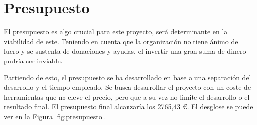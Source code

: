 \section{Presupuesto}

El presupuesto es algo crucial para este proyecto, será determinante en la viabilidad de este. Teniendo en cuenta que la organización no tiene ánimo de lucro y se sustenta de donaciones y ayudas, el invertir una gran suma de dinero podría ser inviable.

Partiendo de esto, el presupuesto se ha desarrollado en base a una separación del desarrollo y el tiempo empleado. Se busca desarrollar el proyecto con un coste de herramientas que no eleve el precio, pero que a su vez no limite el desarrollo o el resultado final. El presupuesto final alcanzaría los 2765,43 €. El desglose se puede ver en la Figura \ref{fig:presupuesto}.

